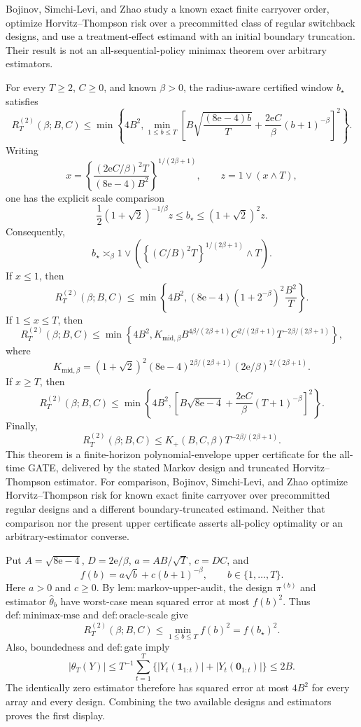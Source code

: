 Bojinov, Simchi-Levi, and Zhao study a known exact finite carryover order, optimize Horvitz--Thompson risk over a precommitted class of regular switchback designs, and use a treatment-effect estimand with an initial boundary truncation.  Their result is not an all-sequential-policy minimax theorem over arbitrary estimators.

For every \(T\ge2\), \(C\ge0\), and known \(\beta>0\), the radius-aware certified window \(b_\star\) satisfies
\[
 R_T^{(2)}(\beta;B,C)
 \le
 \min\!\left\{
 4B^2,
 \min_{1\le b\le T}
 \left[
 B\sqrt{\frac{(8\mathrm e-4)b}{T}}
 +\frac{2\mathrm e C}{\beta}(b+1)^{-\beta}
 \right]^2
 \right\}.
\]
Writing
\[
 x=\left\{
 \frac{(2\mathrm e C/\beta)^2T}{(8\mathrm e-4)B^2}
 \right\}^{1/(2\beta+1)},
 \qquad z=1\vee(x\wedge T),
\]
one has the explicit scale comparison
\[
 \frac12(1+\sqrt2)^{-1/\beta}z
 \le b_\star\le(1+\sqrt2)^2z.
\]
Consequently,
\[
 b_\star\asymp_\beta
 1\vee\left(
 \left\{(C/B)^2T\right\}^{1/(2\beta+1)}\wedge T
 \right).
\]
If \(x\le1\), then
\[
 R_T^{(2)}(\beta;B,C)
 \le
 \min\left\{4B^2,(8\mathrm e-4)(1+2^{-\beta})^2\frac{B^2}{T}\right\}.
\]
If \(1\le x\le T\), then
\[
 R_T^{(2)}(\beta;B,C)
 \le
 \min\left\{4B^2,
 K_{\mathrm{mid},\beta}
 B^{4\beta/(2\beta+1)}C^{2/(2\beta+1)}
 T^{-2\beta/(2\beta+1)}
 \right\},
\]
where
\[
 K_{\mathrm{mid},\beta}
 =(1+\sqrt2)^2(8\mathrm e-4)^{2\beta/(2\beta+1)}
 (2\mathrm e/\beta)^{2/(2\beta+1)}.
\]
If \(x\ge T\), then
\[
 R_T^{(2)}(\beta;B,C)
 \le
 \min\left\{4B^2,
 \left[B\sqrt{8\mathrm e-4}
 +\frac{2\mathrm e C}{\beta}(T+1)^{-\beta}\right]^2
 \right\}.
\]
Finally,
\[
 R_T^{(2)}(\beta;B,C)
 \le K_+(B,C,\beta)T^{-2\beta/(2\beta+1)}.
\]
This theorem is a finite-horizon polynomial-envelope upper certificate for the all-time GATE, delivered by the stated Markov design and truncated Horvitz--Thompson estimator.  For comparison, Bojinov, Simchi-Levi, and Zhao optimize Horvitz--Thompson risk for known exact finite carryover over precommitted regular designs and a different boundary-truncated estimand.  Neither that comparison nor the present upper certificate asserts all-policy optimality or an arbitrary-estimator converse.

Put \(A=\sqrt{8\mathrm e-4}\), \(D=2\mathrm e/\beta\), \(a=AB/\sqrt T\), \(c=DC\), and
\[
 f(b)=a\sqrt b+c(b+1)^{-\beta},
 \qquad b\in\{1,\ldots,T\}.
\]
Here \(a>0\) and \(c\ge0\).  By \(\mathrm{lem{:}markov\mbox{-}upper\mbox{-}audit}\), the design \(\pi^{(b)}\) and estimator \(\widehat\theta_b\) have worst-case mean squared error at most \(f(b)^2\).  Thus \(\mathrm{def{:}minimax\mbox{-}mse}\) and \(\mathrm{def{:}oracle\mbox{-}scale}\) give
\[
 R_T^{(2)}(\beta;B,C)\le\min_{1\le b\le T}f(b)^2=f(b_\star)^2.
\]
Also, boundedness and \(\mathrm{def{:}gate}\) imply
\[
 |\theta_T(Y)|
 \le T^{-1}\sum_{t=1}^T
 \{|Y_t(\mathbf1_{1:t})|+|Y_t(\mathbf0_{1:t})|\}
 \le2B.
\]
The identically zero estimator therefore has squared error at most \(4B^2\) for every array and every design.  Combining the two available designs and estimators proves the first display.

